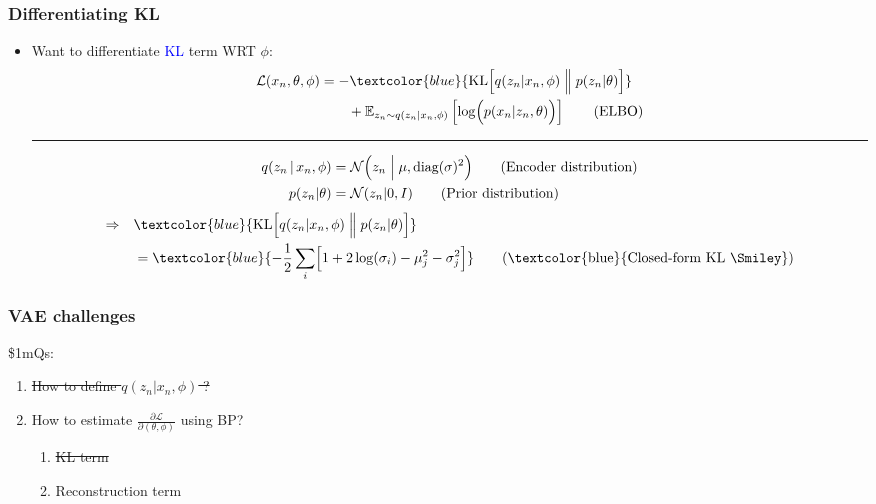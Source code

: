 \documentclass[xcolor=table,dvipsnames]{beamer}
\begin{document}
\begin{frame}[t]
    \frametitle{Differentiating KL}
    \begin{itemize}
        \item Want to differentiate \textcolor{blue}{KL} term WRT $\phi$:
        \begin{align*}
            \mathcal{L}(x_n, \theta, \phi) &= -\textcolor{blue}{\text{KL}\Bigl[q(z_n \vert x_n, \phi) \Bigm\Vert p(z_n \vert \theta)\Bigr]} \\
            &\qquad + \mathbb{E}_{z_n\sim q(z_n \vert x_n, \phi)}\left[ \log \Bigl(p(x_n \vert z_n, \theta)\Bigr) \right] \tag{ELBO}
        \end{align*}
        \hrule
        \begin{align*}
            q(z_n \,\vert\, x_n, \phi) &= \mathcal{N}\Bigl( z_n \Bigm\vert \mu, \text{diag}(\sigma)^2 \Bigr) \tag{Encoder distribution} \\
            p(z_n\vert\theta) &= \mathcal{N}(z_n\vert 0, I) \tag{Prior distribution} \\
        \end{align*}
        \begin{align*}
            \Rightarrow\quad &\textcolor{blue}{\text{KL}\Bigl[q(z_n \vert x_n, \phi) \Bigm\Vert p(z_n \vert \theta)\Bigr]} \\
            &= \textcolor{blue}{-\frac{1}{2}\sum_i \Bigl[ 1 + 2\log(\sigma_i) - \mu_j^2 - \sigma_j^2 \Bigr]} \tag{\textcolor{blue}{Closed-form KL \Smiley}}
        \end{align*}
    \end{itemize}
\end{frame}

\begin{frame}
    \frametitle{VAE challenges}
    \$1mQs:
    \begin{enumerate}
        \setlength{\itemsep}{2em}
        \vspace{2em}
        \item \sout{How to define $q(z_n \vert x_n, \phi)$ ?}
        \item How to estimate $\frac{\partial\mathcal{L}}{\partial(\theta,\phi)}$ using BP?
        \begin{enumerate}
            \setlength{\itemsep}{2em}
            \vspace{2em}
            \item \sout{KL term}
            \item Reconstruction term
        \end{enumerate}
    \end{enumerate}
\end{frame}
\end{document}
